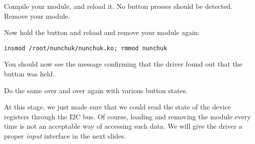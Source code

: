 Compile your module, and reload it. No button presses should be
detected. Remove your module.

Now hold the  button and reload and remove your module again:
\begin{verbatim}
insmod /root/nunchuk/nunchuk.ko; rmmod nunchuk
\end{verbatim}

You should now see the message confirming that the driver found
out that the  button was held.

Do the same over and over again with various button states.

At this stage, we just made sure that we could read the state
of the device registers through the I2C bus. Of course, loading and
removing the module every time is not an acceptable way of 
accessing such data. We will give the driver a proper {\em input}
interface in the next slides.
